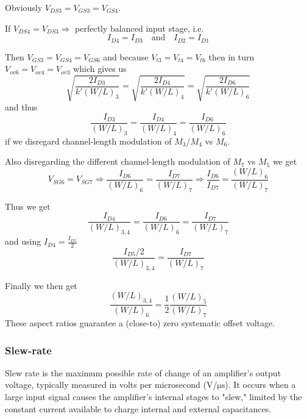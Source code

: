 \documentclass[12pt, a4paper]{article}%
\begin{document}
Obviously $V_{DS3} = V_{GS3} = V_{GS4}$.

If $V_{DS4} = V_{DS3} \Rightarrow$ perfectly balanced input stage, i.e. 
\begin{equation}
    I_{D4} = I_{D3} \quad \text{and} \quad I_{D2} = I_{D1}
\end{equation}

Then $V_{GS3} = V_{GS4} = V_{GS6}$ and because $V_{t3} = V_{t4} = V_{t6}$ then in turn $V_{ov6} = V_{ov4} = V_{ov3}$ which gives us
\begin{equation}
    \sqrt{\frac{2I_{D3}}{k'(W/L)_3}} = \sqrt{\frac{2I_{D4}}{k'(W/L)_4}} = \sqrt{\frac{2I_{D6}}{k'(W/L)_6}}
\end{equation}
and thus
\begin{equation}
    \frac{I_{D3}}{(W/L)_3} = \frac{I_{D4}}{(W/L)_4} = \frac{I_{D6}}{(W/L)_6}
\end{equation}
if we disregard channel-length modulation of $M_3/M_4$ vs $M_6$.

Also disregarding the different channel-length modulation of $M_7$ vs $M_5$ we get
\begin{equation}
V_{SG6} = V_{SG7} \Rightarrow \frac{I_{D6}}{(W/L)_6} = \frac{I_{D7}}{(W/L)_7} \Rightarrow \frac{I_{D6}}{I_{D7}} = \frac{(W/L)_6}{(W/L)_7}
\end{equation}

Thus we get
\begin{equation}
    \frac{I_{D4}}{(W/L)_{3,4}} = \frac{I_{D6}}{(W/L)_6} = \frac{I_{D7}}{(W/L)_7} 
\end{equation}
and using $I_{D4} = \frac{I_{D5}}{2}$
\begin{equation}
    \frac{I_{D5}/2}{(W/L)_{3,4}} = \frac{I_{D7}}{(W/L)_7}
\end{equation}

Finally we then get
\begin{equation}
\boxed{\frac{(W/L)_{3,4}}{(W/L)_6} = \frac{1}{2} \frac{(W/L)_5}{(W/L)_7}}
\end{equation}
These aspect ratios guarantee a (close-to) zero systematic offset voltage.

\subsubsection{Slew-rate}
Slew rate is the maximum possible rate of change of an amplifier's output voltage, typically measured in volts per microsecond ($\mathrm{V/\mu s}$). It occurs when a large input signal causes the amplifier's internal stages to "slew," limited by the constant current available to charge internal and external capacitances.
\end{document}
